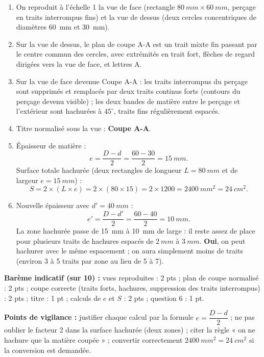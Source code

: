 \documentclass[11pt]{article}
\begin{document}
\begin{corrige}
\begin{enumerate}
\item On reproduit à l'échelle 1 la vue de face (rectangle $\SI{80}{mm} \times \SI{60}{mm}$, perçage en traits interrompus fins) et la vue de dessus (deux cercles concentriques de diamètres \SI{60}{mm} et \SI{30}{mm}).
\item Sur la vue de dessus, le plan de coupe A-A est un trait mixte fin passant par le centre commun des cercles, avec extrémités en trait fort, flèches de regard dirigées vers la vue de face, et lettres A.
\item Sur la vue de face devenue Coupe A-A : les traits interrompus du perçage sont supprimés et remplacés par deux traits continus forts (contours du perçage devenu visible) ; les deux bandes de matière entre le perçage et l'extérieur sont hachurées à $45^{\circ}$, traits fins régulièrement espacés.
\item Titre normalisé sous la vue : \textbf{Coupe A-A}.
\item Épaisseur de matière :
\[ e = \frac{D - d}{2} = \frac{60 - 30}{2} = \SI{15}{mm}. \]
Surface totale hachurée (deux rectangles de longueur $L = \SI{80}{mm}$ et de largeur $e = \SI{15}{mm}$) :
\[ S = 2 \times (L \times e) = 2 \times (80 \times 15) = 2 \times 1200 = \SI{2400}{mm^2} = \SI{24}{cm^2}. \]
\item Nouvelle épaisseur avec $d' = \SI{40}{mm}$ :
\[ e' = \frac{D - d'}{2} = \frac{60 - 40}{2} = \SI{10}{mm}. \]
La zone hachurée passe de \SI{15}{mm} à \SI{10}{mm} de large : il reste assez de place pour plusieurs traits de hachures espacés de $\SI{2}{mm}$ à $\SI{3}{mm}$. \textbf{Oui}, on peut hachurer avec le même espacement ; on aura simplement moins de traits (environ 3 à 5 traits par zone au lieu de 5 à 7).
\end{enumerate}
\textbf{Barème indicatif (sur 10) :} vues reproduites : 2 pts ; plan de coupe normalisé : 2 pts ; coupe correcte (traits forts, hachures, suppression des traits interrompus) : 2 pts ; titre : 1 pt ; calculs de $e$ et $S$ : 2 pts ; question 6 : 1 pt.

\textbf{Points de vigilance :} justifier chaque calcul par la formule $e = \dfrac{D-d}{2}$ ; ne pas oublier le facteur 2 dans la surface hachurée (deux zones) ; citer la règle « on ne hachure que la matière coupée » ; convertir correctement $\SI{2400}{mm^2} = \SI{24}{cm^2}$ si la conversion est demandée.
\end{corrige}
\end{document}
